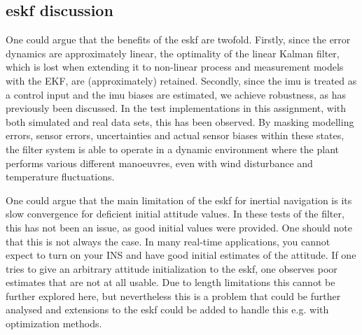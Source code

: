 
\subsection{\acrshort{eskf} discussion}

One could argue that the benefits of the \acrshort{eskf} are twofold. Firstly, since the error dynamics are approximately linear, the optimality of the linear Kalman filter, which is lost when extending it to non-linear process and measurement models with the EKF, are (approximately) retained. Secondly, since the \acrshort{imu} is treated as a control input and the \acrshort{imu} biases are estimated, we achieve robustness, as has previously been discussed. In the test implementations in this assignment, with both simulated and real data sets, this has been observed. By masking modelling errors, sensor errors, uncertainties and actual sensor biases within these states, the filter system is able to operate in a dynamic environment where the plant performs various different manoeuvres, even with wind disturbance and temperature fluctuations.

One could argue that the main limitation of the \acrshort{eskf} for inertial navigation is its slow convergence for deficient initial attitude values. In these tests of the filter, this has not been an issue, as good initial values were provided. One should note that this is not always the case. In many real-time applications, you cannot expect to turn on your INS and have good initial estimates of the attitude. If one tries to give an arbitrary attitude initialization to the \acrshort{eskf}, one observes poor estimates that are not at all usable. Due to length limitations this cannot be further explored here, but nevertheless this is a problem that could be further analysed and extensions to the \acrshort{eskf} could be added to handle this e.g. with optimization methods.